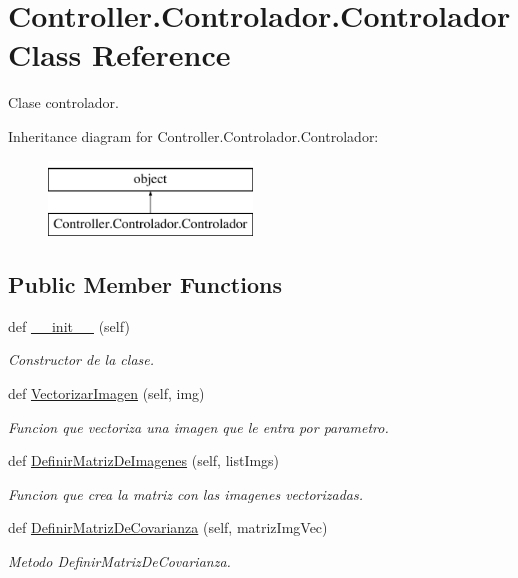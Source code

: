 \hypertarget{class_controller_1_1_controlador_1_1_controlador}{}\section{Controller.\+Controlador.\+Controlador Class Reference}
\label{class_controller_1_1_controlador_1_1_controlador}


Clase controlador.  


Inheritance diagram for Controller.\+Controlador.\+Controlador\+:\begin{figure}[H]
\begin{center}
\leavevmode
\includegraphics[height=2.000000cm]{class_controller_1_1_controlador_1_1_controlador}
\end{center}
\end{figure}
\subsection*{Public Member Functions}
\begin{DoxyCompactItemize}
\item 
def \hyperlink{class_controller_1_1_controlador_1_1_controlador_ad30f895c86fb2085fbd3b2c0a1c9f38c}{\+\_\+\+\_\+init\+\_\+\+\_\+} (self)
\begin{DoxyCompactList}\small\item\em Constructor de la clase. \end{DoxyCompactList}\item 
def \hyperlink{class_controller_1_1_controlador_1_1_controlador_a4bbeb1232cf73c6c9113e7ffda714b63}{Vectorizar\+Imagen} (self, img)
\begin{DoxyCompactList}\small\item\em Funcion que vectoriza una imagen que le entra por parametro. \end{DoxyCompactList}\item 
def \hyperlink{class_controller_1_1_controlador_1_1_controlador_a88254f919a6b1d7ed25e2f54b528a15c}{Definir\+Matriz\+De\+Imagenes} (self, list\+Imgs)
\begin{DoxyCompactList}\small\item\em Funcion que crea la matriz con las imagenes vectorizadas. \end{DoxyCompactList}\item 
def \hyperlink{class_controller_1_1_controlador_1_1_controlador_a4c342a4b7f56c2f8a566cdf62030816c}{Definir\+Matriz\+De\+Covarianza} (self, matriz\+Img\+Vec)
\begin{DoxyCompactList}\small\item\em Metodo Definir\+Matriz\+De\+Covarianza. \end{DoxyCompactList}\end{DoxyCompactItemize}
